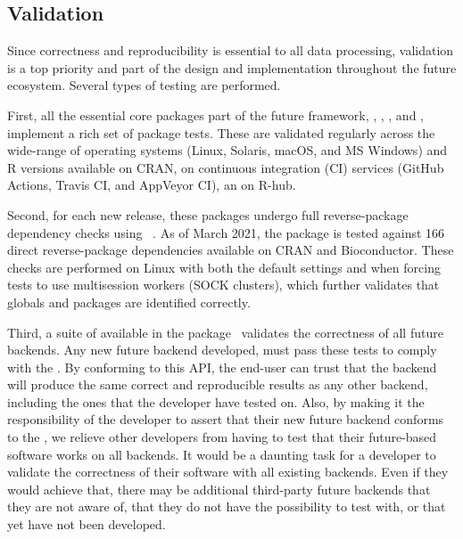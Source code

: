 \subsection{Validation}
\label{validation}

Since correctness and reproducibility is essential to all data
processing, validation is a top priority and part of the design and
implementation throughout the future ecosystem.  Several types of
testing are performed.

First, all the essential core packages part of the future framework,
, , , and ,
implement a rich set of package tests.  These are validated regularly
across the wide-range of operating systems (Linux, Solaris, macOS, and
MS Windows) and R versions available on CRAN, on continuous
integration (CI) services (GitHub Actions, Travis CI, and AppVeyor
CI), an on R-hub.

Second, for each new release, these packages undergo full
reverse-package dependency checks
using ~\citep{GitHub:revdepcheck}.  As of March 2021,
the  package is tested against 166 direct reverse-package
dependencies available on CRAN and Bioconductor.  These checks are
performed on Linux with both the default settings and when forcing
tests to use multisession workers (SOCK clusters), which further
validates that globals and packages are identified correctly.

Third, a suite of  available in the
 package~\citep{CRAN:future.tests} validates the
correctness of all future backends.  Any new future backend developed,
must pass these tests to comply with the .  By
conforming to this API, the end-user can trust that the backend will
produce the same correct and reproducible results as any other
backend, including the ones that the developer have tested on.  Also,
by making it the responsibility of the developer to assert that their
new future backend conforms to the , we relieve other
developers from having to test that their future-based software works
on all backends.  It would be a daunting task for a developer to
validate the correctness of their software with all existing
backends. Even if they would achieve that, there may be additional
third-party future backends that they are not aware of, that they do
not have the possibility to test with, or that yet have not been
developed.

